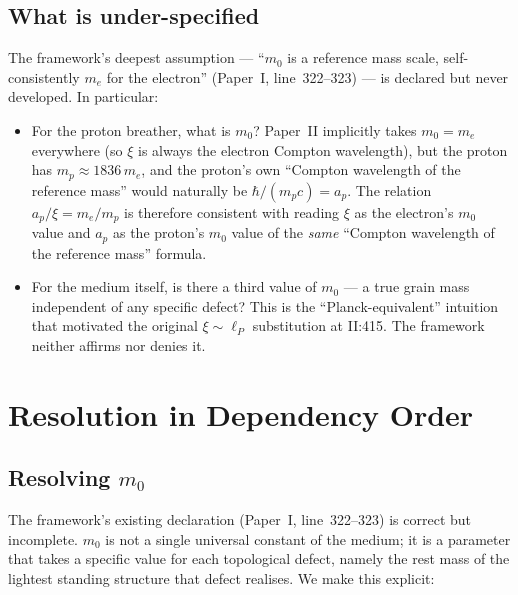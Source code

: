 \documentclass[11pt,a4paper]{article}
\begin{document}
\subsection{What is under-specified}

The framework's deepest assumption --- ``$m_0$ is a reference mass scale,
self-consistently $m_e$ for the electron'' (Paper~I, line~322--323) --- is
declared but never developed.  In particular:

\begin{itemize}
\item For the proton breather, what is $m_0$?  Paper~II implicitly takes
      $m_0 = m_e$ everywhere (so $\xi$ is always the electron Compton
      wavelength), but the proton has $m_p \approx 1836\, m_e$, and the
      proton's own ``Compton wavelength of the reference mass'' would
      naturally be $\hbar/(m_p c) = a_p$.  The relation $a_p/\xi = m_e/m_p$
      is therefore consistent with reading $\xi$ as the electron's $m_0$
      value and $a_p$ as the proton's $m_0$ value of the \emph{same}
      ``Compton wavelength of the reference mass'' formula.
\item For the medium itself, is there a third value of $m_0$ --- a true
      grain mass independent of any specific defect?  This is the
      ``Planck-equivalent'' intuition that motivated the original
      $\xi \sim \ell_P$ substitution at II:415.  The framework neither
      affirms nor denies it.
\end{itemize}

\section{Resolution in Dependency Order}

\subsection{Resolving $m_0$}

The framework's existing declaration (Paper~I, line~322--323) is correct
but incomplete.  $m_0$ is not a single universal constant of the medium;
it is a parameter that takes a specific value for each topological defect,
namely the rest mass of the lightest standing structure that defect
realises.  We make this explicit:
\end{document}
